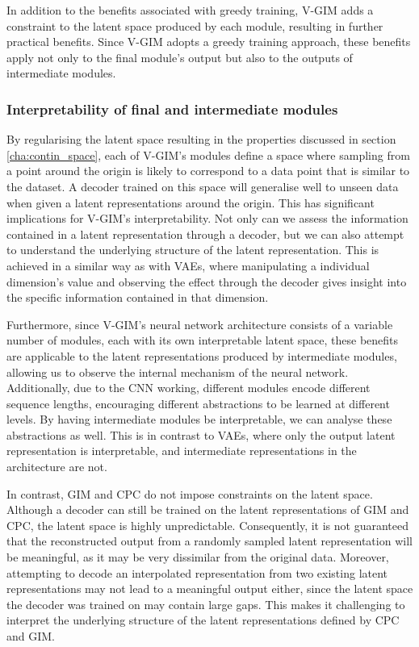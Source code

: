 	In addition to the benefits associated with greedy training, V-GIM adds a constraint to the latent space produced by each module, resulting in further practical benefits. Since V-GIM adopts a greedy training approach, these benefits apply not only to the final module's output but also to the outputs of intermediate modules.
	

	\subsubsection{Interpretability of final and intermediate modules}
		By regularising the latent space resulting in the properties discussed in section \ref{cha:contin_space}, each of V-GIM's modules define a space where sampling from a point around the origin is likely to correspond to a data point that is similar to the dataset. A decoder trained on this space will generalise well to unseen data when given a latent representations around the origin. This has significant implications for V-GIM's interpretability. Not only can we assess the information contained in a latent representation through a decoder, but we can also attempt to understand the underlying structure of the latent representation. This is achieved in a similar way as with VAEs, where manipulating a individual dimension's value and observing the effect through the decoder gives insight into the specific information contained in that dimension.
		
		Furthermore, since V-GIM's neural network architecture consists of a variable number of modules, each with its own interpretable latent space, these benefits are applicable to the latent representations produced by intermediate modules, allowing us to observe the internal mechanism of the neural network. Additionally, due to the CNN working, different modules encode different sequence lengths, encouraging different abstractions to be learned at different levels. By having intermediate modules be interpretable, we can analyse these abstractions as well. This is in contrast to VAEs, where only the output latent representation is interpretable, and intermediate representations in the architecture are not.
		
		In contrast, GIM and CPC do not impose constraints on the latent space. Although a decoder can still be trained on the latent representations of GIM and CPC, the latent space is highly unpredictable. Consequently, 
		it is not guaranteed that the reconstructed output from a randomly sampled latent representation will be meaningful, as it may be very dissimilar from the original data. Moreover, attempting to decode an interpolated representation from two existing latent representations may not lead to a meaningful output either, since the latent space the decoder was trained on may contain large gaps. This makes it challenging to interpret the underlying structure of the latent representations defined by CPC and GIM.

